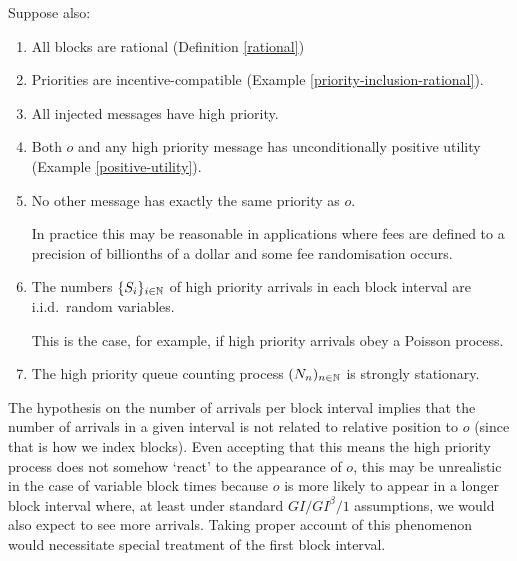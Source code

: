 \documentclass[a4paper,11pt]{article}
\begin{document}
Suppose also:
\begin{enumerate}
  \item 
    All blocks are rational (Definition \ref{rational})
    
  \item
    Priorities are incentive-compatible (Example \ref{priority-inclusion-rational}).
    
  \item 
    All injected messages have high priority.
    
  \item 
    Both $o$ and any high priority message has unconditionally positive utility (Example \ref{positive-utility}).
    
  \item 
    No other message has exactly the same priority as $o$.
    
    In practice this may be reasonable in applications where fees are defined to a precision of billionths of a dollar and some fee randomisation occurs.
    
  \item
    The numbers $\{S_i\}_{i\in\mathbb N}$ of high priority arrivals in each block interval are i.i.d.~random variables. 
     
    This is the case, for example, if high priority arrivals obey a Poisson process.
    
  \item
    The high priority queue counting process $(N_{n})_{n\in\mathbb N}$ is strongly stationary.
    
\end{enumerate}

\begin{remark}

  The hypothesis on the number of arrivals per block interval implies that the number of arrivals in a given interval is not related to relative position to $o$ (since that is how we index blocks).
  Even accepting that this means the high priority process does not somehow `react' to the appearance of $o$, this may be unrealistic in the case of variable block times because $o$ is more likely to appear in a longer block interval where, at least under standard $GI/GI^\beta/1$ assumptions, we would also expect to see more arrivals.
  Taking proper account of this phenomenon would necessitate special treatment of the first block interval.
  
\end{remark}
\end{document}
